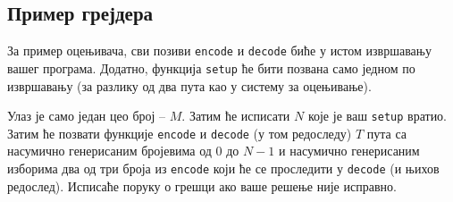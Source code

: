 \documentclass[12pt]{article}
\begin{document}
\subsection{Пример грејдера}

За пример оцењивача, сви позиви \texttt{encode} и \texttt{decode} биће у истом извршавању вашег програма. Додатно, функција \texttt{setup} ће бити позвана само једном по извршавању (за разлику од два пута као у систему за оцењивање).

Улаз је само један цео број -- $M$. Затим ће исписати $N$ које је ваш \texttt{setup} вратио. Затим ће позвати функције \texttt{encode} и \texttt{decode} (у том редоследу) $T$ пута са насумично генерисаним бројевима од $0$ до $N-1$ и насумично генерисаним изборима два од три броја из \texttt{encode} који ће се проследити у \texttt{decode} (и њихов редослед). Исписаће поруку о грешци ако ваше решење није исправно.
\end{document}
